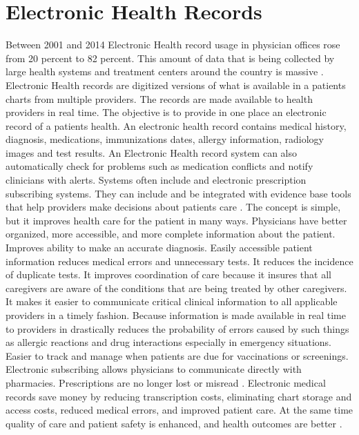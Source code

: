 \documentclass[sigconf]{acmart}
\begin{document}
\section{Electronic Health Records}

Between 2001 and 2014 Electronic Health record usage in physician offices rose from 20 percent to 82 percent. This amount of data that is being collected by large health systems and treatment centers around the country is massive \cite{www-google-pred}. 
Electronic Health records are digitized versions of what is available in a patients charts from multiple providers. The records are made available to health providers in real time. The objective is to provide in one place an electronic record of a patients health. An electronic health record contains medical history, diagnosis, medications, immunizations dates, allergy information, radiology images and test results.  An Electronic Health record system can also automatically check for problems such as medication conflicts and notify clinicians with alerts. Systems often include and electronic prescription subscribing systems. They can include and be integrated with evidence base tools that help providers make decisions about patients care \cite{www-google-elec}.  
The concept is simple, but it improves health care for the patient in many ways. Physicians have better organized, more accessible, and more complete information about the patient.  Improves ability to make an accurate diagnosis.  Easily accessible patient information reduces medical errors and unnecessary tests. It reduces the incidence of duplicate tests. It improves coordination of care because it insures that all caregivers are aware of the conditions that are being treated by other caregivers. It makes it easier to communicate critical clinical information to all applicable providers in a timely fashion. Because information is made available in real time to providers in drastically reduces the probability of errors caused by such things as allergic reactions and drug interactions especially in emergency situations.  Easier to track and manage when patients are due for vaccinations or screenings. Electronic subscribing allows physicians to communicate directly with pharmacies. Prescriptions are no longer lost or misread \cite{www-google-elec}.
Electronic medical records save money by reducing transcription costs, eliminating chart storage and access costs, reduced medical errors, and improved patient care. At the same time quality of care and patient safety is enhanced, and health outcomes are better \cite{www-google-elec}. 
\end{document}
